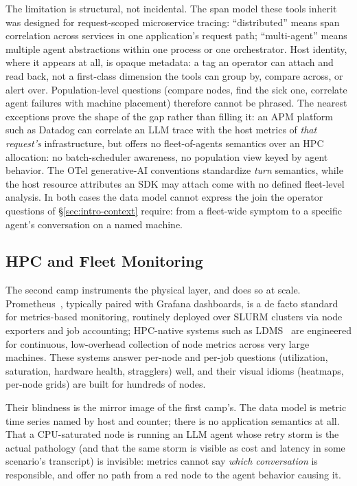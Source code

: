 The limitation is structural, not incidental. The span model these tools
inherit was designed for request-scoped microservice tracing:
``distributed'' means span correlation across services in one
application's request path; ``multi-agent'' means multiple agent
abstractions within one process or one orchestrator. Host identity, where
it appears at all, is opaque metadata: a tag an operator can attach and
read back, not a first-class dimension the tools can group by, compare
across, or alert over. Population-level questions (compare nodes,
find the sick one, correlate agent failures with machine placement)
therefore cannot be phrased. The nearest exceptions prove the shape of the gap
rather than filling it: an APM platform such as Datadog can correlate an
LLM trace with the host metrics of \emph{that request's} infrastructure,
but offers no fleet-of-agents semantics over an HPC allocation: no
batch-scheduler awareness, no population view keyed by agent behavior.
The OTel generative-AI conventions standardize \emph{turn} semantics,
while the host resource attributes an SDK may attach come with no defined
fleet-level analysis. In both cases the data model cannot express the join
the operator questions of \S\ref{sec:intro-context} require: from a
fleet-wide symptom to a specific agent's conversation on a named machine.

\subsection{HPC and Fleet Monitoring}
\label{sec:bg-sota-hpc}

The second camp instruments the physical layer, and does so at scale.
Prometheus~\cite{prometheus}, typically paired with Grafana dashboards, is
a de facto standard for metrics-based monitoring, routinely deployed over
SLURM clusters via node exporters and job accounting; HPC-native systems such as
LDMS~\cite{agelastos2014ldms} are engineered for continuous, low-overhead
collection of node metrics across very large machines. These systems answer
per-node and per-job questions (utilization, saturation, hardware
health, stragglers) well, and their visual idioms (heatmaps, per-node grids) are
built for hundreds of nodes.

Their blindness is the mirror image of the first camp's. The data model is
metric time series named by host and counter; there is no application
semantics at all. That a CPU-saturated node is running an LLM agent whose
retry storm is the actual pathology (and that the same storm is visible as
cost and latency in some scenario's transcript) is invisible: metrics
cannot say \emph{which conversation} is responsible, and offer no path from
a red node to the agent behavior causing it.

